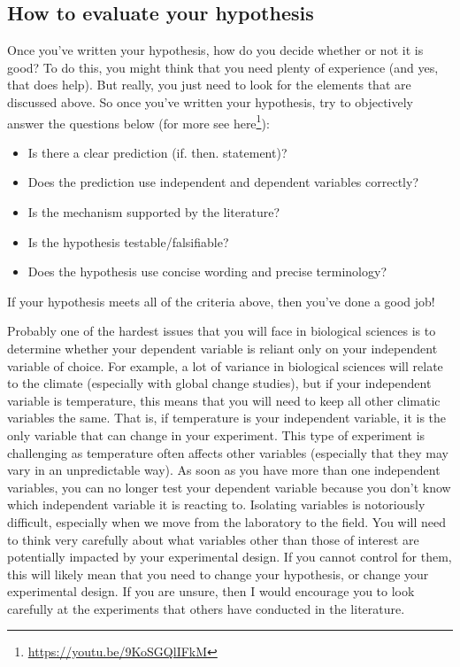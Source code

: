 \documentclass[
]{krantz}
\providecommand{\tightlist}{%
  \setlength{\itemsep}{0pt}\setlength{\parskip}{0pt}}
\renewcommand{\href}[2]{#2\footnote{\url{#1}}}
\begin{document}
\hypertarget{how-to-evaluate-your-hypothesis}{%
\subsection{How to evaluate your hypothesis}\label{how-to-evaluate-your-hypothesis}}

Once you've written your hypothesis, how do you decide whether or not it is good? To do this, you might think that you need plenty of experience (and yes, that does help). But really, you just need to look for the elements that are discussed above. So once you've written your hypothesis, try to objectively answer the questions below (for more see \href{https://youtu.be/9KoSGQlIFkM}{here}):

\begin{itemize}
\tightlist
\item
  Is there a clear prediction (if. then. statement)?
\item
  Does the prediction use independent and dependent variables correctly?
\item
  Is the mechanism supported by the literature?
\item
  Is the hypothesis testable/falsifiable?
\item
  Does the hypothesis use concise wording and precise terminology?
\end{itemize}

If your hypothesis meets all of the criteria above, then you've done a good job!

Probably one of the hardest issues that you will face in biological sciences is to determine whether your dependent variable is reliant only on your independent variable of choice. For example, a lot of variance in biological sciences will relate to the climate (especially with global change studies), but if your independent variable is temperature, this means that you will need to keep all other climatic variables the same. That is, if temperature is your independent variable, it is the only variable that can change in your experiment. This type of experiment is challenging as temperature often affects other variables (especially that they may vary in an unpredictable way). As soon as you have more than one independent variables, you can no longer test your dependent variable because you don't know which independent variable it is reacting to. Isolating variables is notoriously difficult, especially when we move from the laboratory to the field. You will need to think very carefully about what variables other than those of interest are potentially impacted by your experimental design. If you cannot control for them, this will likely mean that you need to change your hypothesis, or change your experimental design. If you are unsure, then I would encourage you to look carefully at the experiments that others have conducted in the literature.
\end{document}
